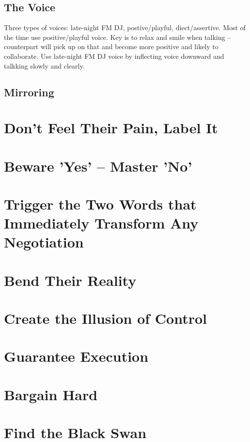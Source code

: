 \documentclass{summary}
\begin{document}
\subsection{The Voice}
Three types of voices: late-night FM DJ, postive/playful, diect/assertive. Most of the time use positive/playful voice. Key is to relax and smile when talking -- counterpart will pick up on that and become more positive and likely to collaborate. Use late-night FM DJ voice by inflecting voice downward and talkking slowly and clearly.

\subsection{Mirroring}

\section{Don't Feel Their Pain, Label It}

\section{Beware 'Yes' -- Master 'No'}

\section{Trigger the Two Words that Immediately Transform Any Negotiation}

\section{Bend Their Reality}

\section{Create the Illusion of Control}

\section{Guarantee Execution}

\section{Bargain Hard}

\section{Find the Black Swan}
\end{document}
